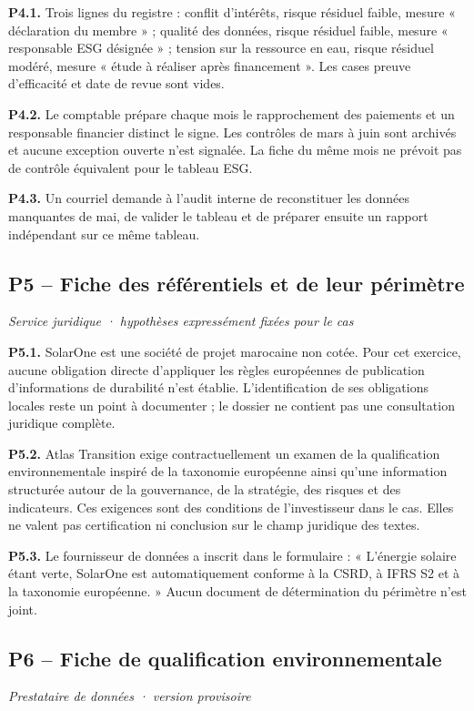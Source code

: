 \documentclass[11pt,a4paper]{article}
\begin{document}
\textbf{P4.1.} Trois lignes du registre : conflit d’intérêts, risque résiduel faible, mesure « déclaration du membre » ; qualité des données, risque résiduel faible, mesure « responsable ESG désignée » ; tension sur la ressource en eau, risque résiduel modéré, mesure « étude à réaliser après financement ». Les cases preuve d’efficacité et date de revue sont vides.

\textbf{P4.2.} Le comptable prépare chaque mois le rapprochement des paiements et un responsable financier distinct le signe. Les contrôles de mars à juin sont archivés et aucune exception ouverte n’est signalée. La fiche du même mois ne prévoit pas de contrôle équivalent pour le tableau ESG.

\textbf{P4.3.} Un courriel demande à l’audit interne de reconstituer les données manquantes de mai, de valider le tableau et de préparer ensuite un rapport indépendant sur ce même tableau.

\subsection{P5 -- Fiche des référentiels et de leur périmètre}
\textit{Service juridique · hypothèses expressément fixées pour le cas}

\textbf{P5.1.} SolarOne est une société de projet marocaine non cotée. Pour cet exercice, aucune obligation directe d’appliquer les règles européennes de publication d’informations de durabilité n’est établie. L’identification de ses obligations locales reste un point à documenter ; le dossier ne contient pas une consultation juridique complète.

\textbf{P5.2.} Atlas Transition exige contractuellement un examen de la qualification environnementale inspiré de la taxonomie européenne ainsi qu’une information structurée autour de la gouvernance, de la stratégie, des risques et des indicateurs. Ces exigences sont des conditions de l’investisseur dans le cas. Elles ne valent pas certification ni conclusion sur le champ juridique des textes.

\textbf{P5.3.} Le fournisseur de données a inscrit dans le formulaire : « L’énergie solaire étant verte, SolarOne est automatiquement conforme à la CSRD, à IFRS S2 et à la taxonomie européenne. » Aucun document de détermination du périmètre n’est joint.

\subsection{P6 -- Fiche de qualification environnementale}
\textit{Prestataire de données · version provisoire}
\end{document}
